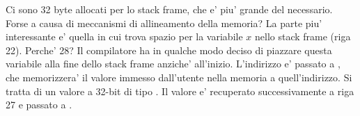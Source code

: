 

Ci sono 32 byte allocati per lo stack frame, che e' piu' grande del necessario. Forse a causa di meccanismi di allineamento della memoria?
La parte piu' interessante e' quella in cui trova spazio per la variabile $x$ nello stack frame (riga 22).
Perche' 28? Il compilatore ha in qualche modo deciso di piazzare questa variabile alla fine dello stack frame anziche' all'inizio.
L'indirizzo e' passato a \scanf, che memorizzera' il valore immesso dall'utente nella memoria a quell'indirizzo.
Si tratta di un valore a 32-bit di tipo \Tint.
Il valore e' recuperato successivamente a riga 27 e passato a \printf.

